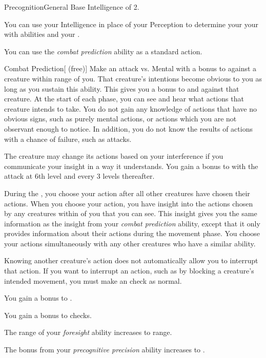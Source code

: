     \begin{feat}{Precognition}{General}
        \featpre Base Intelligence of 2.

         You can use your Intelligence in place of your Perception to determine your your  with  abilities and your .

         You can use the \textit{combat prediction} ability as a standard action.
        \begin{freeability}{Combat Prediction}[ (free)]
            Make an attack vs. Mental with a  bonus to  against a creature within \rngmed range of you.
            \hit That creature's intentions become obvious to you as long as you sustain this ability.
            This gives you a  bonus to  and  against that creature.
            At the start of each phase, you can see and hear what actions that creature intends to take.
            You do not gain any knowledge of actions that have no obvious signs, such as purely mental actions, or actions which you are not observant enough to notice.
            In addition, you do not know the results of actions with a chance of failure, such as attacks.

            The creature may change its actions based on your interference if you communicate your insight in a way it understands.
            \rankline
            You gain a  bonus to  with the attack at 6th level and every 3 levels thereafter.
        \end{freeability}

         During the , you choose your action after all other creatures have chosen their actions.
        When you choose your action, you have insight into the actions chosen by any creatures within \shortrange of you that you can see.
        This insight gives you the same information as the insight from your \textit{combat prediction} ability, except that it only provides information about their actions during the movement phase.
        You choose your actions simultaneously with any other creatures who have a similar ability.

        Knowing another creature's action does not automatically allow you to interrupt that action.
        If you want to interrupt an action, such as by blocking a creature's intended movement, you must make an  check as normal.

         You gain a  bonus to .

         You gain a  bonus to  checks.

         The range of your \textit{foresight} ability increases to \rnglong range.

         The bonus from your \textit{precognitive precision} ability increases to .
    \end{feat}

